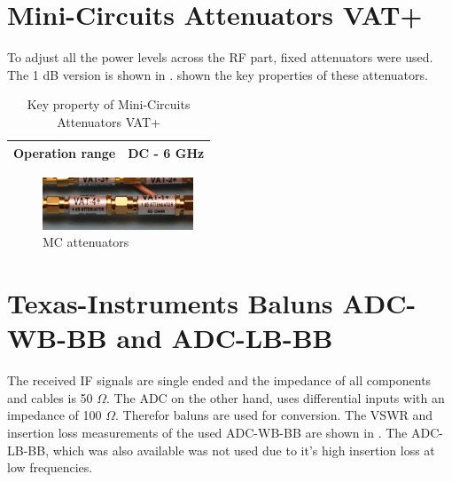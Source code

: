 \section{Mini-Circuits Attenuators VAT+}
\label{sec:comp_vat}
To adjust all the power levels across the \gls{RF} part, fixed
attenuators were used. The 1 dB version is shown in
.  shown the key properties
of these attenuators.

\begin{table}[h]
  \centering
  \begin{tabular}{|l|l|}
    \hline
    Operation range & DC - 6 GHz \\ \hline
  \end{tabular}
  \caption{Key property of Mini-Circuits Attenuators VAT+ \cite{mc_vat1}}
  \label{tab:comp_dc_block}
\end{table}

\begin{figure}[p]
  \centering
  \includegraphics[width=0.4\textwidth]{pictures/attenuator}
  \caption{\gls{MC} attenuators}
  \label{fig:comp_vat_pic}
\end{figure}

\section{Texas-Instruments Baluns ADC-WB-BB and ADC-LB-BB}
\label{sec:comp_balun}
The received \gls{IF} signals are single ended and the impedance of all
components and cables is 50 $\Omega$. The \gls{ADC} on the other hand, uses
differential inputs with an impedance of 100 $\Omega$. Therefor baluns are used
for conversion. The \gls{VSWR} and insertion loss measurements of the used
ADC-WB-BB are shown in . The ADC-LB-BB, which was also
available was not used due to it's high insertion loss at low frequencies. \\

